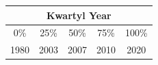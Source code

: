 \documentclass[12pt]{article}
\begin{document}
	\begin{table}[h]
		\centering
		\begin{tabular}{|ccccc|}
			\hline
			\multicolumn{5}{|c|}{Kwartyl Year}                                                                                                                                                             \\ \hline
			\multicolumn{1}{|c|}{0\%}                          & \multicolumn{1}{c|}{25\%}                         & \multicolumn{1}{c|}{50\%} & \multicolumn{1}{c|}{75\%}                         & 100\% \\ \hline
			\multicolumn{1}{|c|}{\cellcolor[HTML]{FFFFFF}1980} & \multicolumn{1}{c|}{\cellcolor[HTML]{FFFFFF}2003} & \multicolumn{1}{c|}{2007} & \multicolumn{1}{c|}{\cellcolor[HTML]{FFFFFF}2010} & 2020  \\ \hline


\end{tabular}
\end{table}
\end{document}
